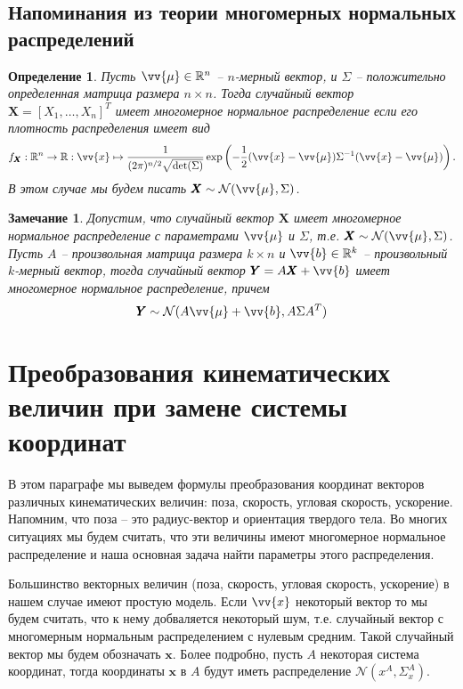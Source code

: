 \documentclass[12pt]{article}
\newtheorem{remark}[theorem]{Замечание}
\newtheorem{definition}[theorem]{Определение}
\begin{document}
\subsection{Напоминания из теории многомерных нормальных распределений}

\begin{definition} Пусть $\vv{\mu}\in\mathbb{R}^n$ -- $n$-мерный вектор,
    и $\Sigma$ -- положительно определенная матрица размера $n\times n$. Тогда
    случайный вектор $\pmb{X}=[X_1,\ldots,X_n]^T$ имеет многомерное
    нормальное распределение если его плотность распределения  имеет вид
    $$
        f_{\pmb{X}}:\mathbb{R}^n\to\mathbb{R}
        :\vv{x}\mapsto \frac{1}{(2\pi)^{n/2}\sqrt{\det(\Sigma)}}
        \exp\left(
        -\frac{1}{2}(\vv{x}-\vv{\mu})\Sigma^{-1}(\vv{x}-\vv{\mu})
        \right).
    $$
    В этом случае мы будем писать
    $\pmb{X}\sim \mathcal{N}(\vv{\mu}, \Sigma)$.
\end{definition}

\begin{remark} Допустим, что случайный вектор $\pmb{X}$ имеет
    многомерное нормальное распределение с параметрами $\vv{\mu}$ и $\Sigma$,
    т.е. $\pmb{X}\sim \mathcal{N}(\vv{\mu}, \Sigma)$.
    Пусть $A$ -- произвольная матрица размера $k\times n$
    и $\vv{b}\in\mathbb{R}^k$ -- произвольный $k$-мерный вектор,
    тогда случайный вектор $\pmb{Y}=A \pmb{X}+\vv{b}$ имеет многомерное
    нормальное распределение, причем
    $$
        \pmb{Y}\sim\mathcal{N}(A\vv{\mu}+\vv{b}, A\Sigma A^T)
    $$
\end{remark}



\section{Преобразования кинематических величин при замене системы координат}

В этом параграфе мы выведем формулы преобразования координат векторов
различных кинематических величин: поза, скорость, угловая скорость, ускорение.
Напомним, что поза -- это радиус-вектор и ориентация твердого тела.
Во многих ситуациях мы будем считать, что эти величины имеют многомерное
нормальное распределение и наша основная задача найти параметры
этого распределения.

Большинство векторных величин (поза, скорость, угловая скорость, ускорение)
в нашем случае имеют простую модель. Если $\vv{x}$ некоторый вектор то мы
будем считать, что к нему добваляется некоторый шум,
т.е. случайный вектор с многомерным нормальным распределением с нулевым средним. 
Такой случайный вектор мы будем обозначать $\pmb{x}$. Более подробно, 
пусть $A$ некоторая система координат, тогда координаты $\pmb{x}$ в $A$ 
будут иметь распределение $\mathcal{N}(x^A, \Sigma_x^A)$.
\end{document}
